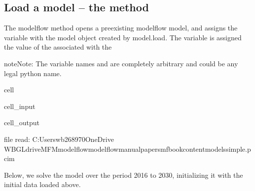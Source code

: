 \documentclass[letterpaper,10pt,english]{jupyterBook}
\begin{document}
\subsection{Load a model – the method }
\label{\detokenize{content/05_SimpleModel/SimpleModel:load-a-model-the-method-modelload}}
\sphinxAtStartPar
The modelflow method  opens a pre\sphinxhyphen{}existing modelflow model, and assigns the variable  with the model object created by model.load. The variable  is assigned the value of the  associated with the

\begin{sphinxadmonition}{note}{Note:}
\sphinxAtStartPar
The variable names  and  are completely arbitrary and could be any legal python name.
\end{sphinxadmonition}

\begin{sphinxuseclass}{cell}\begin{sphinxVerbatimInput}

\begin{sphinxuseclass}{cell_input}
\begin{sphinxVerbatim}[commandchars=\\\{\}]
  
\end{sphinxVerbatim}

\end{sphinxuseclass}\end{sphinxVerbatimInput}
\begin{sphinxVerbatimOutput}

\begin{sphinxuseclass}{cell_output}
\begin{sphinxVerbatim}[commandchars=\\\{\}]
file read:  C:\PYGZbs{}Users\PYGZbs{}wb268970\PYGZbs{}OneDrive \PYGZhy{} WBG\PYGZbs{}Ldrive\PYGZbs{}MFM\PYGZbs{}modelflow\PYGZbs{}modelflow\PYGZhy{}manual\PYGZbs{}papers\PYGZbs{}mfbook\PYGZbs{}content\PYGZbs{}models\PYGZbs{}simple.pcim
\end{sphinxVerbatim}

\end{sphinxuseclass}\end{sphinxVerbatimOutput}

\end{sphinxuseclass}
\sphinxAtStartPar
Below, we solve the model over the period 2016 to 2030, initializing it with the initial data loaded above.
\end{document}
